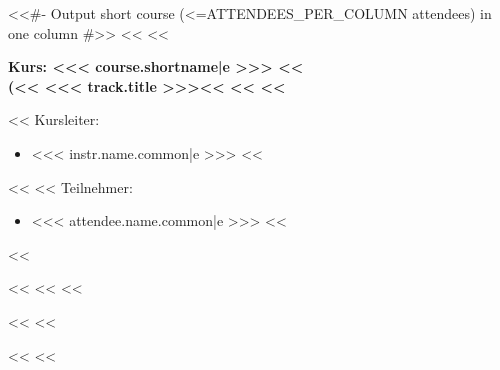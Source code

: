             <<#- Output short course (<=ATTENDEES_PER_COLUMN attendees) in one column #>>
            <<%
                <<%
                \begin{minipage}[t]{0.5\textwidth}
                    {\headingfamily\bfseries
                        Kurs: <<< course.shortname|e >>>
                        <<%
                            \\\mdseries
                            (<<%
                                <<< track.title >>><<%
                             <<%
                        <<%
                        \vspace{0.6\baselineskip}
                    }

                    <<%
                        Kursleiter:
                        \begin{itemize}
                            <<%
                                \item <<< instr.name.common|e >>>
                            <<%
                        \end{itemize}
                    <<%
                    <<%
                        Teilnehmer:
                        \begin{itemize}
                        <<%
                            \item <<< attendee.name.common|e >>>
                        <<%
                        \end{itemize}
                    <<%
                \end{minipage}%
            <<%
            <<%
                <<%


                \pagebreak
            <<%
        <<%


        \pagebreak
    <<%
<<%
